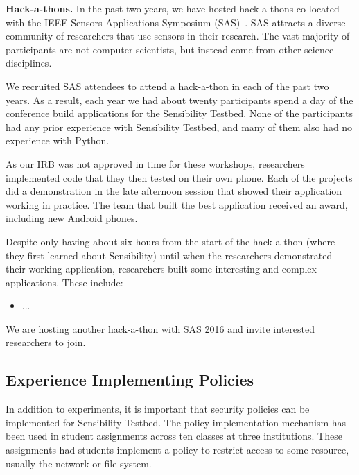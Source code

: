 {\bf Hack-a-thons.}  In the past two years, we have hosted 
hack-a-thons co-located with 
the IEEE Sensors Applications Symposium (SAS)~\cite{sas}.  SAS attracts a 
diverse community of researchers that use sensors in their research.
The vast majority of participants are not computer scientists, but instead
come from other science disciplines.

We recruited SAS attendees to attend a hack-a-thon in each of the past two
years.  As a result, each year we had about twenty participants
spend a day of the conference build applications for the Sensibility Testbed.
None of the participants had any prior experience with 
Sensibility Testbed, and many of them also had no experience with Python.

As our IRB was not approved in time for these workshops, 
researchers implemented code that they then tested on their own phone.
Each of the projects did a demonstration in the late afternoon session that 
showed their application working in practice.  The team that built
the best application received an award, including new Android phones.

Despite only having about six hours from the start of the hack-a-thon (where
they first learned about Sensibility) until when the researchers demonstrated
their working application, researchers built some interesting and complex
applications.  These include:

\begin{itemize}
\item ...

\end{itemize}


We are hosting another hack-a-thon with SAS 2016 and invite interested 
researchers to join. 

\subsection{Experience Implementing Policies}\label{sec-implementing-policies}

In addition to experiments, it is important that security policies can be 
implemented for Sensibility Testbed.  The policy implementation mechanism has 
been used in student assignments across ten classes at three institutions.
These assignments had students implement a policy to restrict access to 
some resource, usually the network or file system.  

